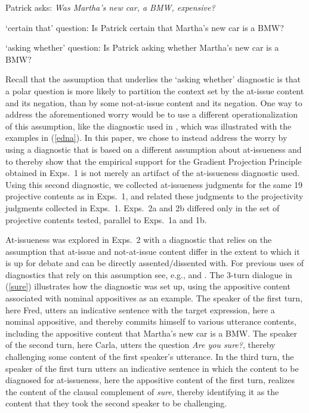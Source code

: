 \documentclass[11pt,fleqn]{article}
\newcommand{\6}{\mbox{$[\hspace*{-.6mm}[$}}
\newcommand{\9}{\mbox{$]\hspace*{-.6mm}]$}}
\begin{document}
\begin{exe}

\exi{(\ref{stim})} Patrick asks: {\em Was Martha's new car, a BMW, expensive?} 

\begin{xlist}
\ex `certain that' question: Is Patrick certain that Martha's new car is a BMW?

\ex `asking whether' question: Is Patrick asking whether Martha's new car is a BMW?

\end{xlist}

\end{exe}

Recall that the assumption that underlies the `asking whether' diagnostic is that a polar question is more likely to partition the context set by the at-issue content and its negation, than by some not-at-issue content and its negation. One way to address the aforementioned worry would be to use a different operationalization of this assumption, like the diagnostic used in \citealt{amaral-etal07}, which was illustrated with the examples in (\ref{edna}). In this paper, we chose to instead address the worry by using a diagnostic that is based on a different assumption about at-issueness and to thereby show that the empirical support for the Gradient Projection Principle obtained in Exps.~1 is not merely an artifact of the at-issueness diagnostic used. Using this second diagnostic, we collected at-issueness judgments for the same 19 projective contents as in Exps.~1, and related these judgments to the projectivity judgments collected in Exps.~1. Exps.~2a and 2b differed only in the set of projective contents tested, parallel to Exps.~1a and 1b. 

At-issueness was explored in Exps.~2 with a diagnostic that relies on the assumption that at-issue and not-at-issue content differ in the extent to which it is up for debate and can be directly assented/dissented with. For previous uses of diagnostics that rely on this assumption see, e.g., \citealt{amaral-etal07,xue-onea11,murray2014,anderbois-etal2015,destruel-etal2015,tonhauser-sula6} and \citealt{syrett-koev2015}. The 3-turn dialogue in (\ref{sure}) illustrates how the diagnostic was set up, using the appositive content associated with nominal appositives as an example. The speaker of the first turn, here Fred, utters an indicative sentence with the target expression, here a nominal appositive, and thereby commits himself to various utterance contents, including the appositive content that Martha's new car is a BMW. The speaker of the second turn, here Carla, utters the question {\em Are you sure?}, thereby challenging some content of the first speaker's utterance. In the third turn, the speaker of the first turn utters an indicative sentence in which the content to be diagnosed for at-issueness, here the appositive content of the first turn, realizes the content of the clausal complement of {\em sure}, thereby identifying it as the content that they took the second speaker to be challenging. 
\end{document}
